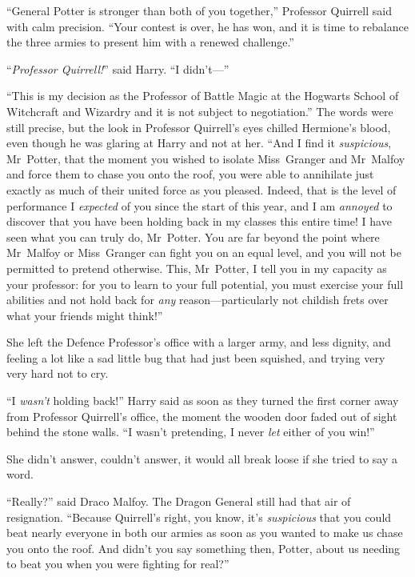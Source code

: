 “General Potter is stronger than both of you together,” Professor Quirrell said with calm precision. “Your contest is over, he has won, and it is time to rebalance the three armies to present him with a renewed challenge.”

“\emph{Professor Quirrell!}” said Harry. “I didn’t—”

“This is my decision as the Professor of Battle Magic at the Hogwarts School of Witchcraft and Wizardry and it is not subject to negotiation.” The words were still precise, but the look in Professor Quirrell’s eyes chilled Hermione’s blood, even though he was glaring at Harry and not at her. “And I find it \emph{suspicious}, Mr~Potter, that the moment you wished to isolate Miss~Granger and Mr~Malfoy and force them to chase you onto the roof, you were able to annihilate just exactly as much of their united force as you pleased. Indeed, that is the level of performance I \emph{expected} of you since the start of this year, and I am \emph{annoyed} to discover that you have been holding back in my classes this entire time! I have seen what you can truly do, Mr~Potter. You are far beyond the point where Mr~Malfoy or Miss~Granger can fight you on an equal level, and you will not be permitted to pretend otherwise. This, Mr~Potter, I tell you in my capacity as your professor: for you to learn to your full potential, you must exercise your full abilities and not hold back for \emph{any} reason—particularly not childish frets over what your friends might think!”

\later

She left the Defence Professor’s office with a larger army, and less dignity, and feeling a lot like a sad little bug that had just been squished, and trying very very hard not to cry.

“I \emph{wasn’t} holding back!” Harry said as soon as they turned the first corner away from Professor Quirrell’s office, the moment the wooden door faded out of sight behind the stone walls. “I wasn’t pretending, I never \emph{let} either of you win!”

She didn’t answer, couldn’t answer, it would all break loose if she tried to say a word.

“Really?” said Draco Malfoy. The Dragon General still had that air of resignation. “Because Quirrell’s right, you know, it’s \emph{suspicious} that you could beat nearly everyone in both our armies as soon as you wanted to make us chase you onto the roof. And didn’t you say something then, Potter, about us needing to beat you when you were fighting for real?”

